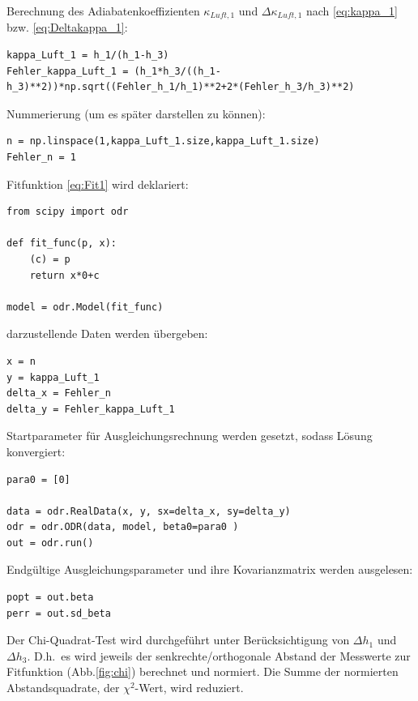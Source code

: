 \documentclass[a4paper,10pt]{article}
\begin{document}
Berechnung des Adiabatenkoeffizienten  \(\kappa_{Luft,1}\) und \(\Delta \kappa_{Luft,1}\) nach \eqref{eq:kappa_1} bzw. \eqref{eq:Deltakappa_1}:\begin{lstlisting}
kappa_Luft_1 = h_1/(h_1-h_3)
Fehler_kappa_Luft_1 = (h_1*h_3/((h_1-h_3)**2))*np.sqrt((Fehler_h_1/h_1)**2+2*(Fehler_h_3/h_3)**2)

\end{lstlisting} 

Nummerierung (um es später darstellen zu können): \begin{lstlisting}
n = np.linspace(1,kappa_Luft_1.size,kappa_Luft_1.size)
Fehler_n = 1

\end{lstlisting}

Fitfunktion \eqref{eq:Fit1} wird deklariert:\begin{lstlisting}
from scipy import odr

def fit_func(p, x):
    (c) = p
    return x*0+c

model = odr.Model(fit_func)

\end{lstlisting}

darzustellende Daten werden übergeben:\begin{lstlisting}
x = n
y = kappa_Luft_1
delta_x = Fehler_n
delta_y = Fehler_kappa_Luft_1

\end{lstlisting}

Startparameter für Ausgleichungsrechnung werden gesetzt, sodass Lösung konvergiert:\begin{lstlisting}
para0 = [0]

data = odr.RealData(x, y, sx=delta_x, sy=delta_y)
odr = odr.ODR(data, model, beta0=para0 )
out = odr.run()

\end{lstlisting}

Endgültige Ausgleichungsparameter und ihre Kovarianzmatrix werden ausgelesen:\begin{lstlisting}
popt = out.beta
perr = out.sd_beta

\end{lstlisting}

Der Chi-Quadrat-Test wird durchgeführt unter Berücksichtigung von \( \Delta h_1\) und \(\Delta h_3\). D.h.~es wird jeweils der senkrechte/orthogonale Abstand der Messwerte zur Fitfunktion (Abb.\ref{fig:chi}) berechnet und normiert\fnrefa.
 Die Summe der normierten Abstandsquadrate, der \unboldmath\( \chi^{2}\)-Wert, wird  reduziert.\boldmath
\end{document}
